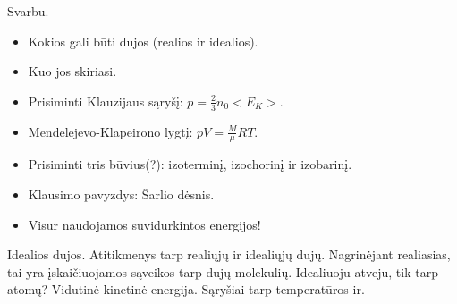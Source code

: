 Svarbu.
\begin{itemize}
  \item Kokios gali būti dujos (realios ir idealios).
  \item Kuo jos skiriasi.
  \item Prisiminti Klauzijaus sąryšį: $p = \frac{2}{3} n_{0} <E_{K}>$.
  \item Mendelejevo-Klapeirono lygtį: $pV = \frac{M}{\mu}RT$.
  \item Prisiminti tris būvius(?): izoterminį, izochorinį ir izobarinį.
  \item Klausimo pavyzdys: Šarlio dėsnis.
  \item Visur naudojamos suvidurkintos energijos!
\end{itemize}

Idealios dujos. Atitikmenys tarp realiųjų ir idealiųjų dujų. Nagrinėjant
realiasias, tai yra įskaičiuojamos sąveikos tarp dujų molekulių. Idealiuoju
atveju, tik tarp atomų? Vidutinė kinetinė energija. Sąryšiai tarp
temperatūros ir.
